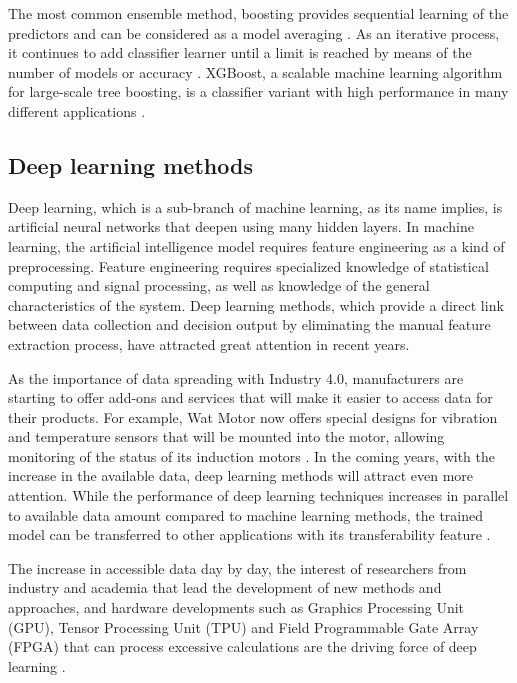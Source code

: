 The most common ensemble method, boosting provides sequential learning of the predictors and can be considered as a model averaging \cite{sewell2011ensemble}. As an iterative process, it continues to add classifier learner until a limit is reached by means of the number of models or accuracy \cite{alpaydin2020introduction}. XGBoost, a scalable machine learning algorithm for large-scale tree boosting, is a classifier variant with high performance in many different applications \cite{chen2021improved}.

\subsection{Deep learning methods}	

Deep learning, which is a sub-branch of machine learning, as its name implies, is artificial neural networks that deepen using many hidden layers. In machine learning, the artificial intelligence model requires feature engineering as a kind of preprocessing. Feature engineering requires specialized knowledge of statistical computing and signal processing, as well as knowledge of the general characteristics of the system. Deep learning methods, which provide a direct link between data collection and decision output by eliminating the manual feature extraction process, have attracted great attention in recent years.

As the importance of data spreading with Industry 4.0, manufacturers are starting to offer add-ons and services that will make it easier to access data for their products. For example, Wat Motor now offers special designs for vibration and temperature sensors that will be mounted into the motor, allowing monitoring of the status of its induction motors \cite{wat2021}. In the coming years, with the increase in the available data, deep learning methods will attract even more attention. While the performance of deep learning techniques increases in parallel to available data amount compared to machine learning methods, the trained model can be transferred to other applications with its transferability feature \cite{zhang2020deep}.

The increase in accessible data day by day, the interest of researchers from industry and academia that lead the development of new methods and approaches, and hardware developments such as Graphics Processing Unit (GPU), Tensor Processing Unit (TPU) and Field Programmable Gate Array (FPGA) that can process excessive calculations are the driving force of deep learning \cite{zhao2019deep,zhang2020deep}.


